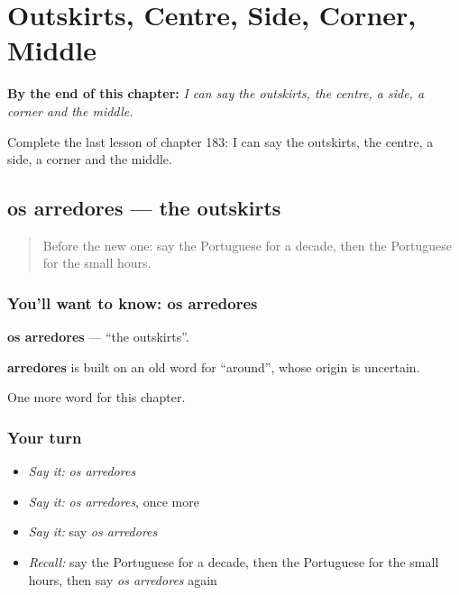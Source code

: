 
\chapter{Outskirts, Centre, Side, Corner, Middle}
\label{ch:pt-outskirts-centre-side-corner-middle}

\begin{chapteropening}
\textbf{By the end of this chapter:} \emph{I can say the outskirts, the centre, a side, a corner and the middle.}

Complete the last lesson of chapter 183: I can say the outskirts, the centre, a side, a corner and the middle.
\end{chapteropening}

\section[os arredores]{os arredores — the outskirts}

\label{lesson:PT-C183-arredores}



\begin{quote}
Before the new one: say the Portuguese for a decade, then the Portuguese for the small hours.
\end{quote}

\subsection*{You'll want to know: os arredores}
\textbf{os arredores} — \textquotedblleft{}the outskirts\textquotedblright{}.

\begin{cousinweb}
\textbf{arredores} is built on an old word for \textquotedblleft{}around\textquotedblright{}, whose origin is uncertain.
\end{cousinweb}

\begin{grammarlens}[title={What you've built}]
One more word for this chapter.
\end{grammarlens}

\subsection*{Your turn}
\begin{itemize}
\raggedright
  \item \emph{Say it:} \emph{os arredores}
  \item \emph{Say it:} \emph{os arredores}, once more
  \item \emph{Say it:} say \emph{os arredores}
  \item \emph{Recall:} say the Portuguese for a decade, then the Portuguese for the small hours, then say \emph{os arredores} again
\end{itemize}

